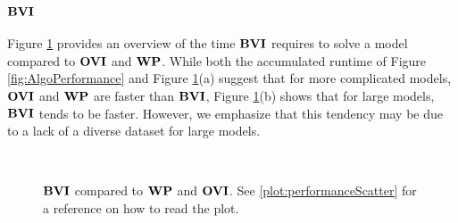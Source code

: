 \subsubsection*{\underline{$\mathbf{BVI}$}}

Figure \ref{fig:BVIvsWPvsOVI} provides an overview of the time $\mathbf{BVI}$ requires to solve a model compared to $\mathbf{OVI}$ and $\mathbf{WP}$.
While both the accumulated runtime of Figure \ref{fig:AlgoPerformance} and Figure \ref{fig:BVIvsWPvsOVI}(a)
suggest that for more complicated models, $\mathbf{OVI}$ and $\mathbf{WP}$ are faster than $\mathbf{BVI}$, 
Figure \ref{fig:BVIvsWPvsOVI}(b) shows that for large models, $\mathbf{BVI}$ tends to be faster. 
However, we emphasize that this tendency may be due to a lack of a diverse dataset for large models.

\begin{figure}[h!]
    \centering
    \
    \caption{$\mathbf{BVI}$ compared to $\mathbf{WP}$ and $\mathbf{OVI}$. See \ref{plot:performanceScatter} for a reference on how to read the plot.}%
    \label{fig:BVIvsWPvsOVI}%
    \end{figure}
\FloatBarrier

